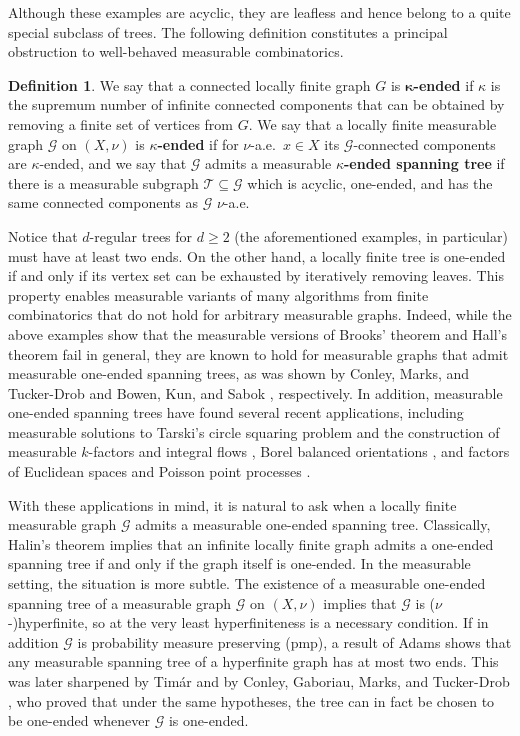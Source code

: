 \documentclass[letterpaper,11pt,reqno]{amsart}
\theoremstyle{bfnote}
\theoremstyle{definition}
\newtheorem{definition}[theorem]{Definition}
\newcommand{\0}{\varnothing}
\renewcommand{\geq}{\geqslant}
\numberwithin{equation}{section}
\begin{document}
Although these examples are acyclic, they are leafless and hence belong to a quite special subclass of trees. The following definition constitutes a principal obstruction to well-behaved measurable combinatorics.
\begin{definition}
    We say that a connected locally finite graph $G$ is $\mathbf{\kappa}$\textbf{-ended} if $\kappa$ is the supremum number of infinite connected components that can be obtained by removing a finite set of vertices from $G.$  We say that a locally finite measurable graph $\mathcal{G}$ on $(X,\nu)$ is $\kappa$\textbf{-ended} if for $\nu$-a.e.\ $x\in X$ its $\mathcal{G}$-connected components are $\kappa$-ended, and we say that $\mathcal{G}$ admits a measurable $\kappa$\textbf{-ended spanning tree} if there is a measurable subgraph $\mathcal{T}\subseteq \mathcal{G}$ which is acyclic, one-ended, and has the same connected components as $\mathcal{G}$ $\nu$-a.e.
\end{definition}

Notice that $d$-regular trees for $d\geq 2$ (the aforementioned examples, in particular) must have at least two ends.  On the other hand, a locally finite tree is one-ended if and only if its vertex set can be exhausted by iteratively removing leaves. This property enables measurable variants of many algorithms from finite combinatorics that do not hold for arbitrary measurable graphs. Indeed, while the above examples show that the measurable versions of Brooks' theorem and Hall's theorem fail in general, they are known to hold for measurable graphs that admit measurable one-ended spanning trees, as was shown by Conley, Marks, and Tucker-Drob \cite{brooks} and Bowen, Kun, and Sabok \cite{bowen.kun.sabok}, respectively.  In addition, measurable one-ended spanning trees have found several recent applications, including measurable solutions to Tarski’s circle squaring problem and the construction of measurable $k$-factors and integral flows \cite{bowen.kun.sabok,bowen2025uniform}, Borel balanced orientations \cite{bowen2022one}, and factors of Euclidean spaces and Poisson point processes \cite{timar2004tree,timar2021nonamenable,Timar_opt_tail}.


With these applications in mind, it is natural to ask when a locally finite measurable graph $\mathcal{G}$ admits a measurable one-ended spanning tree. Classically, Halin’s theorem \cite{halin1964unendliche} implies that an infinite locally finite graph admits a one-ended spanning tree if and only if the graph itself is one-ended.
In the measurable setting, the situation is more subtle. The existence of a measurable one-ended spanning tree of a measurable graph $\mathcal{G}$ on $(X,\nu)$ implies that $\mathcal{G}$ is ($\nu$-)hyperfinite, so at the very least hyperfiniteness is a necessary condition. If in addition $\mathcal{G}$ is probability measure preserving (pmp), a result of Adams \cite{adams} shows that any measurable spanning tree of a hyperfinite graph has at most two ends. This was later sharpened by Tim\'ar \cite{Timar_oneended} and by Conley, Gaboriau, Marks, and Tucker-Drob \cite{cgmtd}, who proved that under the same hypotheses, the tree can in fact be chosen to be one-ended whenever $\mathcal{G}$ is one-ended.
\end{document}
